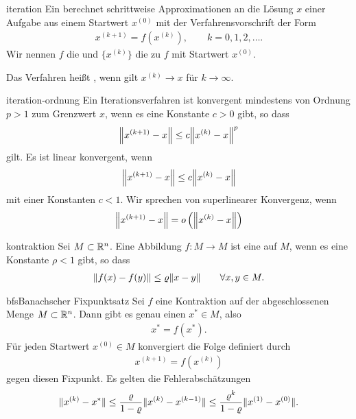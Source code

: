 \begin{Definition}{iteration}
  Ein  berechnet schrittweise
  Approximationen an die Lösung $x$ einer Aufgabe aus einem Startwert
  $x^{(0)}$ mit der Verfahrensvorschrift der Form
  \begin{gather}
    x^{(k+1)} = f(x^{(k)}), \qquad k=0,1,2,\dots.
  \end{gather}
  Wir nennen $f$ die  und $\{x^{(k)}\}$ die
   zu $f$ mit Startwert $x^{(0)}$.
  
  Das Verfahren heißt , wenn gilt $x^{(k)} \to x$
  für $k\to\infty$.
\end{Definition}

\begin{Definition}{iteration-ordnung}
  Ein Iterationsverfahren
   ist konvergent
  mindestens von Ordnung $p>1$ zum Grenzwert $x$, wenn es eine
  Konstante $c>0$ gibt, so dass
  \begin{gather}
    \norm*{x^{(k+1)} - x} \le  c \norm*{x^{(k)} - x}^p
  \end{gather}
  gilt. Es ist linear konvergent, wenn
  \begin{gather}
    \norm*{x^{(k+1)} - x} \le  c \norm*{x^{(k)} - x}
  \end{gather}
  mit einer Konstanten $c<1$. Wir sprechen von superlinearer Konvergenz, wenn
  \begin{gather}
    \norm*{x^{(k+1)} - x} = \smallo\left(\norm*{x^{(k)} - x}\right)
  \end{gather}
\end{Definition}

\begin{Definition}{kontraktion}
  Sei $M\subset\R^n$. Eine Abbildung $f\colon M\to M$ ist eine  auf $M$, wenn es eine Konstante $\rho < 1$ gibt, so dass
  \begin{gather}
    \norm{f(x) - f(y)} \le \rho \norm{x-y} \qquad\forall x,y\in M.
  \end{gather}
\end{Definition}

\begin{Satz*}{bfs}{Banachscher Fixpunktsatz}
  Sei $f$ eine Kontraktion auf der abgeschlossenen Menge
  $M\subset\R^n$. Dann gibt es genau einen  $x^*\in M$,
  also
  \begin{gather}
    x^* = f(x^*).
  \end{gather}
  Für jeden Startwert $x^{(0)}\in M$ konvergiert die Folge definiert durch
  \begin{gather}
    x^{(k+1)} = f\left(x^{(k)}\right)
  \end{gather}
  gegen diesen Fixpunkt. Es gelten die Fehlerabschätzungen
  \begin{gather}
    \norm{x^{(k)}-x^*}
    \le \frac{\rho}{1-\rho}\norm{x^{(k)}-x^{(k-1)}}
    \le \frac{\rho^k}{1-\rho}\norm{x^{(1)}-x^{(0)}}.
  \end{gather}
\end{Satz*}

